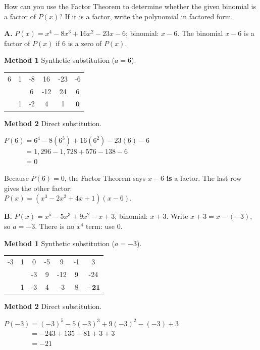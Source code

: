 How can you use the Factor Theorem to determine whether the given binomial is a factor of $P(x)$? If it is a factor, write the polynomial in factored form.

\textbf{A.} $P(x)=x^4-8x^3+16x^2-23x-6$; binomial: $x-6$. \quad The binomial $x-6$ is a factor of $P(x)$ if $6$ is a zero of $P(x)$.

\begin{minipage}[t]{0.48\textwidth}
\vspace{0pt}
\textbf{Method 1} Synthetic substitution ($a=6$).\par
\begin{tabular}{A|CCCCC}
6 & 1 & -8 & 16  & -23 & -6 \\
  &   & 6  & -12 & 24  & 6  \\ 
  & 1 & -2 & 4   & 1   &  \\
\end{tabular}
\end{minipage}\hfill
\begin{minipage}[t]{0.48\textwidth}
\vspace{0pt}
\textbf{Method 2} Direct substitution.\par
$P(6)=6^4-8(6^3)+16(6^2)-23(6)-6$\\
$\phantom{P(6)}=1{,}296-1{,}728+576-138-6$\\
$\phantom{P(6)}=0$
\end{minipage}

\vspace{4pt}
Because $P(6)=0$, the Factor Theorem says $x-6$ \textbf{is} a factor. The last row gives the other factor:\\
\hspace*{2em}$P(x)=(x^3-2x^2+4x+1)(x-6)$.

\newpage
\textbf{B.} $P(x)=x^5-5x^3+9x^2-x+3$; binomial: $x+3$. \quad Write $x+3=x-(-3)$, so $a=-3$. There is no $x^4$ term: use $0$.

\begin{minipage}[t]{0.50\textwidth}
\vspace{0pt}
\textbf{Method 1} Synthetic substitution ($a=-3$).\par
\setlength{\tabcolsep}{4pt}%
\begin{tabular}{A|CCCCCC}
-3 & 1 & 0  & -5 & 9   & -1 & 3   \\
   &   & -3 & 9  & -12 & 9  & -24 \\ 
   & 1 & -3 & 4  & -3  & 8  &  \\
\end{tabular}
\end{minipage}\hfill
\begin{minipage}[t]{0.46\textwidth}
\vspace{0pt}
\textbf{Method 2} Direct substitution.\par
$P(-3)=(-3)^5-5(-3)^3+9(-3)^2-(-3)+3$\\
$\phantom{P(-3)}=-243+135+81+3+3$\\
$\phantom{P(-3)}=-21$
\end{minipage}

